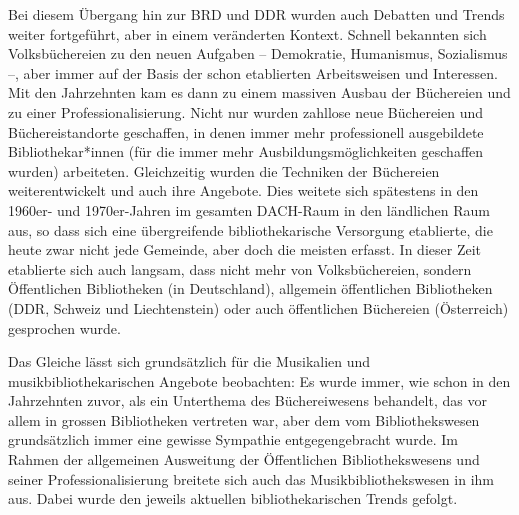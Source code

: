 \documentclass[a4paper,
fontsize=11pt,
oneside,
numbers=noperiodatend,
parskip=half-,
bibliography=totoc,
final
]{scrartcl}
\begin{document}
Bei diesem Übergang hin zur BRD und DDR wurden auch Debatten und Trends
weiter fortgeführt, aber in einem veränderten Kontext. Schnell bekannten
sich Volksbüchereien zu den neuen Aufgaben -- Demokratie, Humanismus,
Sozialismus --, aber immer auf der Basis der schon etablierten
Arbeitsweisen und Interessen. Mit den Jahrzehnten kam es dann zu einem
massiven Ausbau der Büchereien und zu einer Professionalisierung. Nicht
nur wurden zahllose neue Büchereien und Büchereistandorte geschaffen, in
denen immer mehr professionell ausgebildete Bibliothekar*innen (für die
immer mehr Ausbildungsmöglichkeiten geschaffen wurden) arbeiteten.
Gleichzeitig wurden die Techniken der Büchereien weiterentwickelt und
auch ihre Angebote. Dies weitete sich spätestens in den 1960er- und
1970er-Jahren im gesamten DACH-Raum in den ländlichen Raum aus, so dass
sich eine übergreifende bibliothekarische Versorgung etablierte, die
heute zwar nicht jede Gemeinde, aber doch die meisten erfasst. In dieser
Zeit etablierte sich auch langsam, dass nicht mehr von Volksbüchereien,
sondern Öffentlichen Bibliotheken (in Deutschland), allgemein
öffentlichen Bibliotheken (DDR, Schweiz und Liechtenstein) oder auch
öffentlichen Büchereien (Österreich) gesprochen wurde.

Das Gleiche lässt sich grundsätzlich für die Musikalien und
musikbibliothekarischen Angebote beobachten: Es wurde immer, wie schon
in den Jahrzehnten zuvor, als ein Unterthema des Büchereiwesens
behandelt, das vor allem in grossen Bibliotheken vertreten war, aber dem
vom Bibliothekswesen grundsätzlich immer eine gewisse Sympathie
entgegengebracht wurde. Im Rahmen der allgemeinen Ausweitung der
Öffentlichen Bibliothekswesens und seiner Professionalisierung breitete
sich auch das Musikbibliothekswesen in ihm aus. Dabei wurde den jeweils
aktuellen bibliothekarischen Trends gefolgt.
\end{document}

